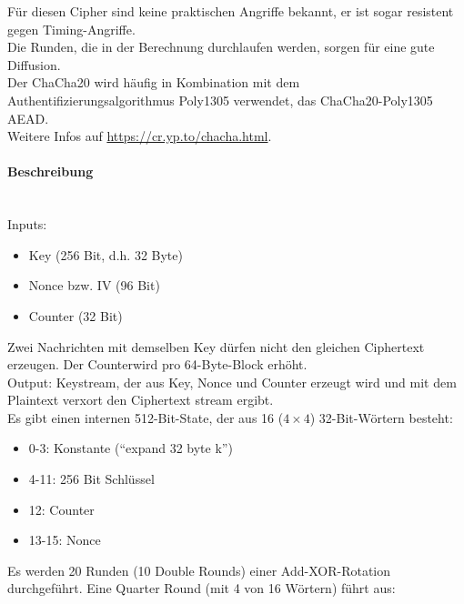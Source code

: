 \noindent Für diesen Cipher sind keine praktischen Angriffe bekannt, er ist sogar resistent gegen Timing-Angriffe.\\

\noindent Die Runden, die in der Berechnung durchlaufen werden, sorgen für eine gute Diffusion. \\

\noindent Der ChaCha20 wird häufig in Kombination mit dem Authentifizierungsalgorithmus Poly1305  verwendet, das ChaCha20-Poly1305 AEAD. \\

\noindent Weitere Infos auf \url{https://cr.yp.to/chacha.html}.

\paragraph{Beschreibung} \mbox{} \\

Inputs:
\begin{itemize}
    \item Key (256 Bit, d.h. 32 Byte)
    \item Nonce bzw. IV (96 Bit)
    \item Counter (32 Bit)
\end{itemize}

\noindent Zwei Nachrichten mit demselben Key dürfen nicht den gleichen Ciphertext erzeugen. Der Counterwird pro 64-Byte-Block erhöht. \\

\noindent Output: Keystream, der aus Key, Nonce und Counter erzeugt wird und mit dem Plaintext verxort den Ciphertext stream ergibt.\\

Es gibt einen internen 512-Bit-State, der aus 16 ($4\times 4$) 32-Bit-Wörtern besteht:
\begin{itemize}
    \item 0-3: Konstante (``expand 32 byte k'')
    \item 4-11: 256 Bit Schlüssel 
    \item 12: Counter
    \item 13-15: Nonce
\end{itemize}

Es werden 20 Runden (10 Double Rounds) einer Add-XOR-Rotation durchgeführt. Eine Quarter Round (mit 4 von 16 Wörtern) führt aus:

